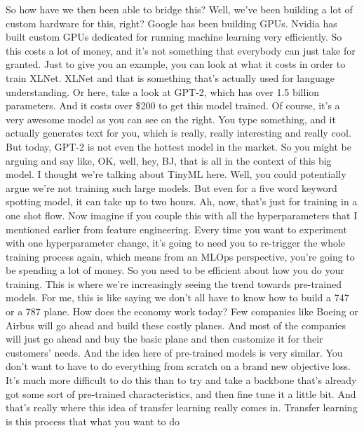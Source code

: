 {    So how have we then been able to bridge this?
    Well, we've been building a lot of custom hardware for this, right?
    Google has been building GPUs.
    Nvidia has built custom GPUs dedicated for running
    machine learning very efficiently.
    So this costs a lot of money, and it's not something
    that everybody can just take for granted.
    Just to give you an example, you can look at what
    it costs in order to train XLNet.
    XLNet and that is something that's actually
    used for language understanding.
    Or here, take a look at GPT-2, which has over 1.5 billion parameters.
    And it costs over \$200 to get this model trained.
    Of course, it's a very awesome model as you can see on the right.
    You type something, and it actually generates text
    for you, which is really, really interesting and really cool.
    But today, GPT-2 is not even the hottest model in the market.
    So you might be arguing and say like, OK, well,
    hey, BJ, that is all in the context of this big model.
    I thought we're talking about TinyML here.
    Well, you could potentially argue we're not training such large models.
    But even for a five word keyword spotting model,
    it can take up to two hours.
    Ah, now, that's just for training in a one shot flow.
    Now imagine if you couple this with all the hyperparameters
    that I mentioned earlier from feature engineering.
    Every time you want to experiment with one hyperparameter
    change, it's going to need you to re-trigger the whole training
    process again, which means from an MLOps perspective,
    you're going to be spending a lot of money.
    So you need to be efficient about how you do your training.
    This is where we're increasingly seeing the trend towards pre-trained models.
    For me, this is like saying we don't all have to know
    how to build a 747 or a 787 plane.
    How does the economy work today?
    Few companies like Boeing or Airbus will go ahead and build these costly planes.
    And most of the companies will just go ahead and buy the basic plane
    and then customize it for their customers' needs.
    And the idea here of pre-trained models is very similar.
    You don't want to have to do everything from scratch on a brand new objective
    loss.
    It's much more difficult to do this than to try and take
    a backbone that's already got some sort of pre-trained characteristics,
    and then fine tune it a little bit.
    And that's really where this idea of transfer learning really comes in.
    Transfer learning is this process that what you want to do
}
